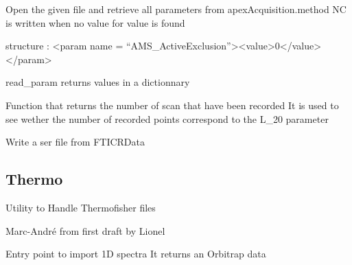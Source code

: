 \documentclass[letterpaper,10pt,openany,oneside]{sphinxmanual}
\begin{document}

\begin{fulllineitems}
\label{rst/code:File.Solarix.read_param}
Open the given file and retrieve all parameters from apexAcquisition.method
NC is written when no value for value is found

structure : \textless{}param name = ``AMS\_ActiveExclusion''\textgreater{}\textless{}value\textgreater{}0\textless{}/value\textgreater{}\textless{}/param\textgreater{}

read\_param returns  values in a dictionnary

\end{fulllineitems}


\begin{fulllineitems}
\label{rst/code:File.Solarix.read_scan}
Function that returns the number of scan that have been recorded
It is used to see wether the number of recorded points correspond to the L\_20 parameter

\end{fulllineitems}


\begin{fulllineitems}
\label{rst/code:File.Solarix.write_ser}
Write a ser file from FTICRData

\end{fulllineitems}



\subsection{Thermo}
\label{rst/code:module-File.Thermo}\label{rst/code:thermo}
Utility to Handle Thermofisher files

Marc-André from first draft by Lionel

\begin{fulllineitems}
\label{rst/code:File.Thermo.Import_1D}
Entry point to import 1D spectra
It returns an Orbitrap data

\end{fulllineitems}
\end{document}
